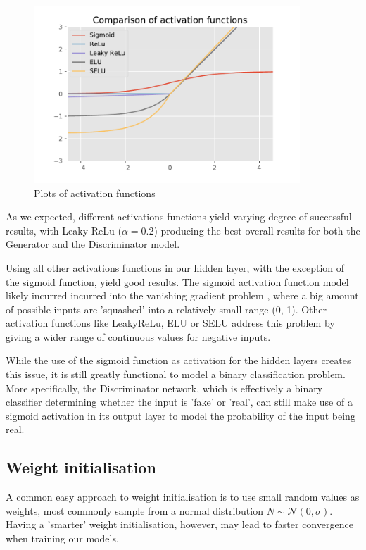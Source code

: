\begin{figure}
\vskip -3mm
\begin{center}
\centerline{\includegraphics[width=10cm]{Figures/ActivationFns}}
\caption{Plots of activation functions}
\label{fig:activationfns}
\end{center}
\vskip -3mm
\end{figure}
As we expected, different activations functions yield varying degree of successful results, with Leaky ReLu ($\alpha=0.2$) producing the best overall results for both the Generator and the Discriminator model.

Using all other activations functions in our hidden layer, with the exception of the sigmoid function, yield good results.
The sigmoid activation function model likely incurred incurred into the vanishing gradient problem \citep{DBLP:journals/corr/abs-1211-5063}, where a big amount of possible inputs are 'squashed' into a relatively small range (0, 1). Other activation functions like LeakyReLu, ELU or SELU address this problem by giving a wider range of continuous values for negative inputs.

While the use of the sigmoid function as activation for the hidden layers creates this issue, it is still greatly functional to model a binary classification problem. More specifically, the Discriminator network, which is effectively a binary classifier determining whether the input is 'fake' or 'real', can still make use of a sigmoid activation in its output layer to model the probability of the input being real.

\subsection{Weight initialisation}
A common easy approach to weight initialisation is to use small random values as weights, most commonly sample from a normal distribution $N\sim \mathcal{N}(0, \sigma)$. Having a 'smarter' weight initialisation, however, may lead to  faster convergence when training our models.

